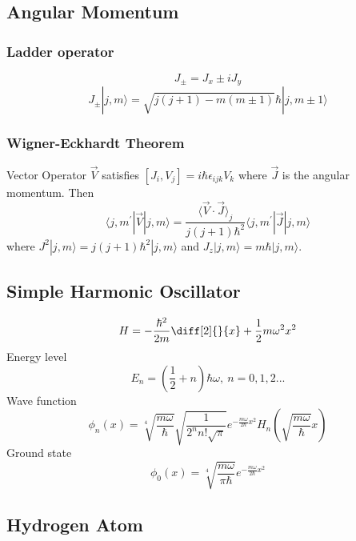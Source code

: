 \documentclass{article}
\newcommand{\ket}[1]{|#1\rangle}
\newcommand{\bra}[1]{\langle #1|}
\begin{document}
\subsection{Angular Momentum}
\subsubsection{Ladder operator}
\begin{equation}
	J_{\pm} = J_x \pm i J_y
\end{equation}
\begin{equation}
	J_\pm \ket{j,m}=\sqrt{j(j+1)-m(m\pm 1)}\hbar\ket{j,m\pm 1}
\end{equation}
\subsubsection{Wigner-Eckhardt Theorem}
Vector Operator $\vec V$ satisfies $[J_i, V_j]=i\hbar \epsilon_{ijk} V_k$ where $\vec J$ is the
angular momentum. Then
$$\bra{j,m^\prime}\vec V \ket{j,m}=
\frac{\langle\vec V\cdot\vec J\rangle_j}{j(j+1)\hbar^2}\bra{j,m^\prime}\vec J\ket{j,m}$$
where $J^2\ket{j,m}=j(j+1)\hbar^2\ket{j,m}$ and $J_z\ket{j,m}=m\hbar\ket{j,m}$.
\subsection{Simple Harmonic Oscillator}
\begin{equation}
	H=-\frac{\hbar^2}{2m}\diff[2]{}{x}+\frac{1}{2}m\omega^2x^2
\end{equation}
Energy level
\begin{equation}
	E_n=(\frac{1}{2}+n)\hbar\omega,\ n=0,1,2...
\end{equation}
Wave function
\begin{equation}
	\phi_n(x)=\sqrt[4]{\frac{m\omega}{\hbar}}\sqrt{\frac{1}{2^nn!\sqrt{\pi}}}e^{-\frac{m\omega}{2\hbar}x^2}H_n(\sqrt{\frac{m\omega}{\hbar}}x)
\end{equation}
Ground state
\begin{equation}
	\phi_0(x)=\sqrt[4]{\frac{m\omega}{\pi\hbar}}e^{-\frac{m\omega}{2\hbar}x^2}
\end{equation}
\subsection{Hydrogen Atom}
\end{document}
